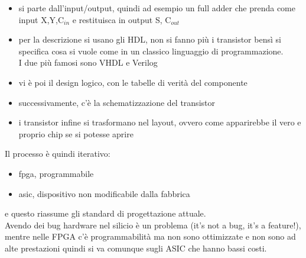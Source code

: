 \documentclass[oneside, 12pt]{extbook}
\begin{document}
\begin{itemize}
	\item si parte dall'input/output, quindi ad esempio un full adder che prenda come input X,Y,C$_{in}$ e restituisca in output S, C$_{out}$
	\item per la descrizione si usano gli HDL, non si fanno più i transistor bensì si specifica cosa si vuole come in un classico linguaggio di programmazione.
	\\I due più famosi sono VHDL e Verilog
	\item vi è poi il design logico, con le tabelle di verità del componente
	\item successivamente, c'è la schematizzazione del transistor
	\item i transistor infine si trasformano nel layout, ovvero come apparirebbe il vero e proprio chip se si potesse aprire
\end{itemize}
Il processo è quindi iterativo:
\begin{itemize}
	\item fpga, programmabile
	\item asic, dispositivo non modificabile dalla fabbrica
\end{itemize}
e questo riassume gli standard di progettazione attuale.
\\Avendo dei bug hardware nel silicio è un problema (it's not a bug, it's a feature!), mentre nelle FPGA c'è programmabilità ma non sono ottimizzate e non sono ad alte prestazioni quindi si va comunque sugli ASIC che hanno bassi costi.
\end{document}
